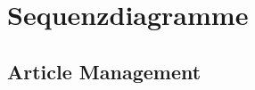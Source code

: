 \documentclass[a4paper]{article}
\begin{document}

\section{Sequenzdiagramme}

\subsection{Article Management}
\end{document}
